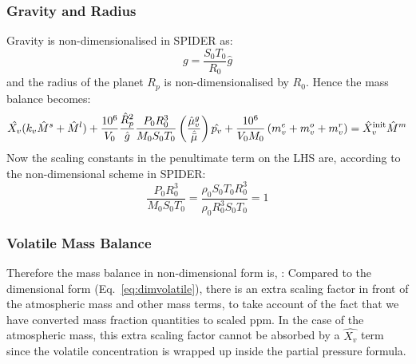 \subsubsection{Gravity and Radius}
Gravity is non-dimensionalised in SPIDER as:
\begin{equation}
g = \frac{S_0 T_0}{R_0} \hat{g}
\end{equation}
and the radius of the planet $R_p$ is non-dimensionalised by $R_0$.  Hence the mass balance becomes:
\begin{equation}
\hat{X_v} (k_v \hat{M}^s + \hat{M}^l) + \frac{10^6}{V_0}\frac{\hat{R}_p^2}{\hat{g}}\frac{P_0 R_0^3}{M_0 S_0 T_0} \left( \frac{\hat{\mu}_v^g}{\hat{\bar{\mu}}} \right) \hat{p_v} + \frac{10^6}{V_0 M_0} \left( m_v^e + m_v^o + m_v^r \right) = \hat{X}_v^{\rm init} \hat{M}^m
\end{equation}
Now the scaling constants in the penultimate term on the LHS are, according to the non-dimensional scheme in SPIDER:
\begin{equation}
\frac{P_0 R_0^3}{M_0 S_0 T_0} = \frac{\rho_0 S_0 T_0 R_0^3}{\rho_0 R_0^3 S_0 T_0} = 1
\end{equation}
\subsubsection{Volatile Mass Balance}
Therefore the mass balance in non-dimensional form is, :  
Compared to the dimensional form (Eq.~\ref{eq:dimvolatile}), there is an extra scaling factor in front of the atmospheric mass and other mass terms, to take account of the fact that we have converted mass fraction quantities to scaled ppm.  In the case of the atmospheric mass, this extra scaling factor cannot be absorbed by a $\hat{X_v}$ term since the volatile concentration is wrapped up inside the partial pressure formula.
